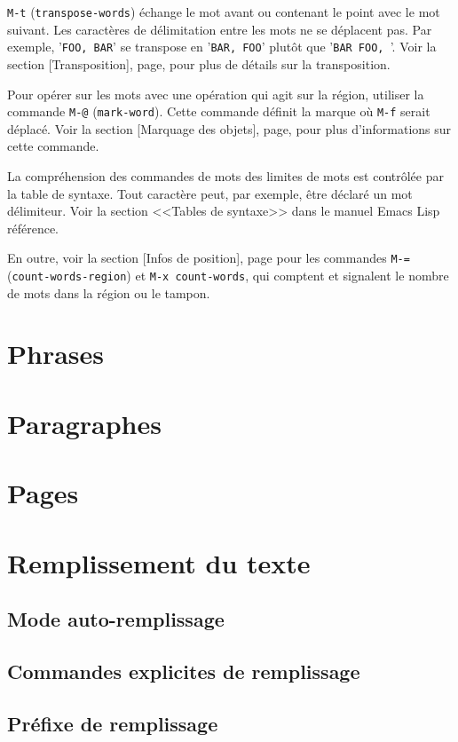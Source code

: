 \texttt{M-t} (\texttt{transpose-words}) échange le mot avant ou
contenant le point avec le mot suivant. Les caractères de délimitation
entre les mots ne se déplacent pas. Par exemple, '\texttt{FOO, BAR}'
se transpose en '\texttt{BAR, FOO}' plutôt que '\texttt{BAR FOO,
}'. Voir la section [Transposition], page,
pour plus de détails sur la transposition.

Pour opérer sur les mots avec une opération qui agit sur la région,
utiliser la commande \texttt{M-@} (\texttt{mark-word}). Cette commande
définit la marque où \texttt{M-f} serait déplacé. Voir la
section [Marquage des objets], page, pour
plus d'informations sur cette commande. 

La compréhension des commandes de mots des limites de mots est
contrôlée par la table de syntaxe. Tout caractère peut, par exemple,
être déclaré un mot délimiteur. Voir la section <<Tables de syntaxe>>
dans le manuel Emacs Lisp référence.

En outre, voir la section [Infos de position],
page pour les commandes \texttt{M-=} (\texttt{count-words-region})
et \texttt{M-x count-words}, qui comptent et signalent le nombre de
mots dans la région ou le tampon. 

\section{Phrases}
\section{Paragraphes}
\section{Pages}
\section{Remplissement du texte}
\subsection{Mode auto-remplissage}
\subsection{Commandes explicites de remplissage}
\subsection{Préfixe de remplissage}
